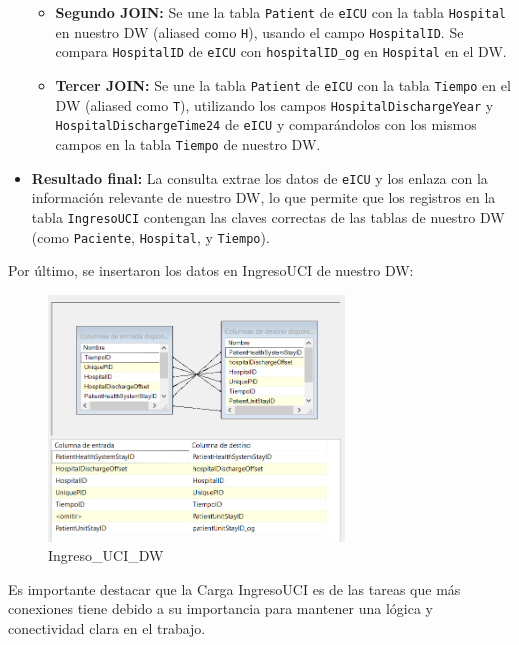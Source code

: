\documentclass[12pt, a4paper, twoside]{article}
\begin{document}
\begin{itemize}
\begin{itemize}
			\item \textbf{Segundo JOIN:} Se une la tabla \texttt{Patient} de \texttt{eICU} con la tabla \texttt{Hospital} en nuestro DW (aliased como \texttt{H}), usando el campo \texttt{HospitalID}. Se compara \texttt{HospitalID} de \texttt{eICU} con \texttt{hospitalID\_og} en \texttt{Hospital} en el DW.
			
			\item \textbf{Tercer JOIN:} Se une la tabla \texttt{Patient} de \texttt{eICU} con la tabla \texttt{Tiempo} en el DW (aliased como \texttt{T}), utilizando los campos \texttt{HospitalDischargeYear} y \texttt{HospitalDischargeTime24} de \texttt{eICU} y comparándolos con los mismos campos en la tabla \texttt{Tiempo} de nuestro DW.
		\end{itemize}
		
		\item \textbf{Resultado final:} La consulta extrae los datos de \texttt{eICU} y los enlaza con la información relevante de nuestro DW, lo que permite que los registros en la tabla \texttt{IngresoUCI} contengan las claves correctas de las tablas de nuestro DW (como \texttt{Paciente}, \texttt{Hospital}, y \texttt{Tiempo}).
	\end{itemize}
	
	Por último, se insertaron los datos en IngresoUCI de nuestro DW:
	
	\begin{figure}[H]
		\centering
		\includegraphics[width=0.7\textwidth]{image/110_carga_ingreso_destino.png}
		\caption{Ingreso\_UCI\_DW}
		\label{fig:28}
	\end{figure}
	
	Es importante destacar que la Carga IngresoUCI es de las tareas que más conexiones tiene debido a su importancia para mantener una lógica y conectividad clara en el trabajo.
	
\end{document}
